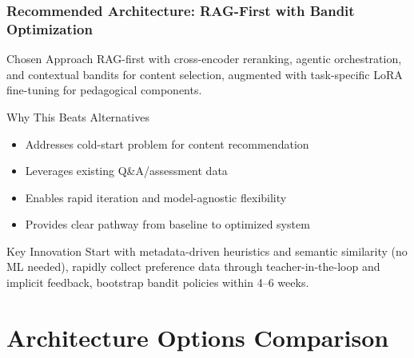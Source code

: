 \documentclass[aspectratio=169]{beamer}
\begin{document}
\begin{frame}
\frametitle{Recommended Architecture: RAG-First with Bandit Optimization}
\begin{block}{Chosen Approach}
RAG-first with cross-encoder reranking, agentic orchestration, and contextual bandits for content selection, augmented with task-specific LoRA fine-tuning for pedagogical components.
\end{block}

\begin{block}{Why This Beats Alternatives}
\begin{itemize}
\item \textcolor{mygreen}{Addresses cold-start problem} for content recommendation
\item \textcolor{mygreen}{Leverages existing Q\&A/assessment data}
\item \textcolor{mygreen}{Enables rapid iteration} and model-agnostic flexibility
\item \textcolor{mygreen}{Provides clear pathway} from baseline to optimized system
\end{itemize}
\end{block}

\begin{alertblock}{Key Innovation}
Start with metadata-driven heuristics and semantic similarity (no ML needed), rapidly collect preference data through teacher-in-the-loop and implicit feedback, bootstrap bandit policies within 4--6 weeks.
\end{alertblock}
\end{frame}

\section{Architecture Options Comparison}
\end{document}
